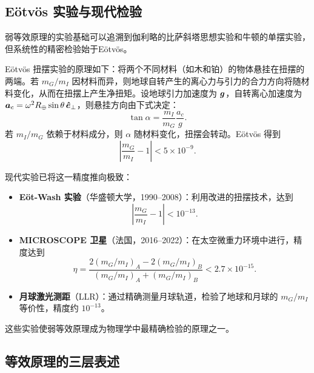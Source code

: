 \subsection{E\"{o}tv\"{o}s 实验与现代检验}

弱等效原理的实验基础可以追溯到伽利略的比萨斜塔思想实验和牛顿的单摆实验，但系统性的精密检验始于E\"{o}tv\"{o}s。

\begin{example}[E\"{o}tv\"{o}s 扭摆实验，1890--1922]
E\"{o}tv\"{o}s 扭摆实验的原理如下：将两个不同材料（如木和铂）的物体悬挂在扭摆的两端。若 $m_G/m_I$ 因材料而异，则地球自转产生的离心力与引力的合力方向将随材料变化，从而在扭摆上产生净扭矩。设地球引力加速度为 $\vb*{g}$，自转离心加速度为 $\vb*{a}_c = \omega^2 R_\oplus \sin\theta \, \vu*{e}_\perp$，则悬挂方向由下式决定：
\begin{equation}
    \tan\alpha = \frac{m_I}{m_G} \frac{a_c}{g}.
\end{equation}
若 $m_I/m_G$ 依赖于材料成分，则 $\alpha$ 随材料变化，扭摆会转动。E\"{o}tv\"{o}s 得到
\begin{equation}
    \left|\frac{m_G}{m_I} - 1\right| < 5 \times 10^{-9}.
\end{equation}
\end{example}

现代实验已将这一精度推向极致：

\begin{itemize}
    \item \textbf{E\"{o}t-Wash 实验}（华盛顿大学，1990--2008）：利用改进的扭摆技术，达到
    \begin{equation}
        \left|\frac{m_G}{m_I} - 1\right| < 10^{-13}.
    \end{equation}
    \item \textbf{MICROSCOPE 卫星}（法国，2016--2022）：在太空微重力环境中进行，精度达到
    \begin{equation}
        \eta = \frac{2(m_G/m_I)_A - 2(m_G/m_I)_B}{(m_G/m_I)_A + (m_G/m_I)_B} < 2.7 \times 10^{-15}.
    \end{equation}
    \item \textbf{月球激光测距}（LLR）：通过精确测量月球轨道，检验了地球和月球的 $m_G/m_I$ 等价性，精度约 $10^{-13}$。
\end{itemize}

这些实验使弱等效原理成为物理学中最精确检验的原理之一。

\subsection{等效原理的三层表述}

